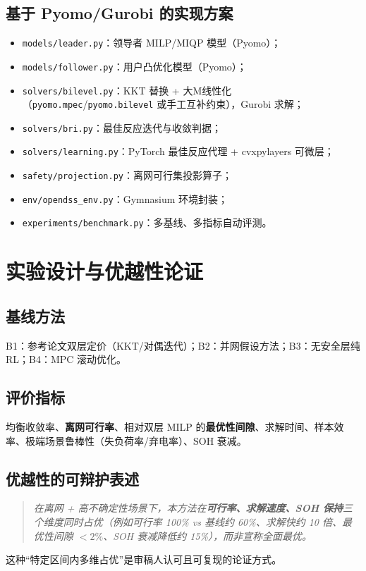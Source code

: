 \documentclass[UTF8,a4paper,11pt]{ctexart}
\begin{document}
\subsection{基于 Pyomo/Gurobi 的实现方案}
\begin{itemize}
  \item \texttt{models/leader.py}：领导者 MILP/MIQP 模型（Pyomo）；
  \item \texttt{models/follower.py}：用户凸优化模型（Pyomo）；
  \item \texttt{solvers/bilevel.py}：KKT 替换 + 大M线性化（\texttt{pyomo.mpec}/\texttt{pyomo.bilevel} 或手工互补约束），Gurobi 求解；
  \item \texttt{solvers/bri.py}：最佳反应迭代与收敛判据；
  \item \texttt{solvers/learning.py}：PyTorch 最佳反应代理 + cvxpylayers 可微层；
  \item \texttt{safety/projection.py}：离网可行集投影算子；
  \item \texttt{env/opendss\_env.py}：Gymnasium 环境封装；
  \item \texttt{experiments/benchmark.py}：多基线、多指标自动评测。
\end{itemize}

\section{实验设计与优越性论证}

\subsection{基线方法}
B1：参考论文双层定价（KKT/对偶迭代）\cite{ref1}；B2：并网假设方法；B3：无安全层纯 RL；B4：MPC 滚动优化。

\subsection{评价指标}
均衡收敛率、\textbf{离网可行率}、相对双层 MILP 的\textbf{最优性间隙}、求解时间、样本效率、极端场景鲁棒性（失负荷率/弃电率）、SOH 衰减。

\subsection{优越性的可辩护表述}
\begin{quote}
\itshape 在离网 + 高不确定性场景下，本方法在\textbf{可行率、求解速度、SOH 保持}三个维度同时占优（例如可行率 100\% vs 基线约 60\%、求解快约 10 倍、最优性间隙 $<2\%$、SOH 衰减降低约 15\%），而非宣称全面最优。
\end{quote}
这种“特定区间内多维占优”是审稿人认可且可复现的论证方式。
\end{document}
